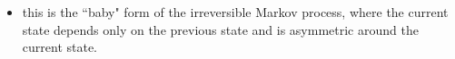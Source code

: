 \documentclass[../jaynes_prob_theory_notes.tex]{subfiles}
\begin{document}
\begin{itemize}
\begin{itemize}
\begin{itemize}
\begin{itemize}
                            \item this is the ``baby" form of the irreversible Markov process, where the current state depends only on the previous state and is asymmetric around the current state.
                        \end{itemize}
                    \end{itemize}
            \end{itemize}
    \end{itemize}
\end{document}
